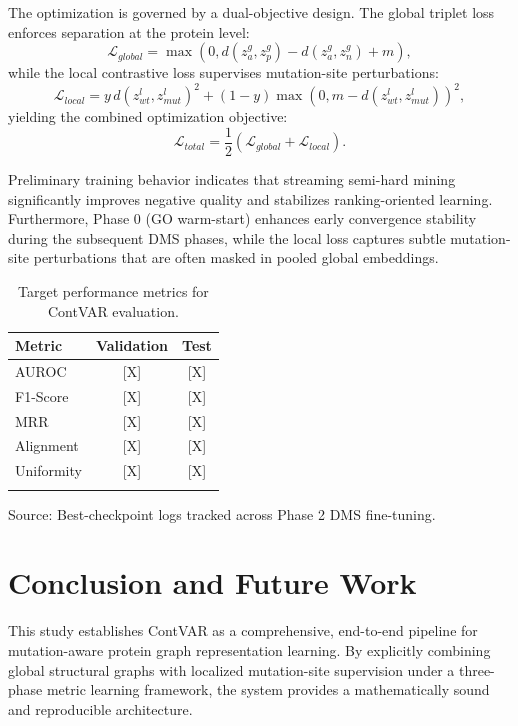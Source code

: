 \documentclass[unnumsec,webpdf,contemporary,large]{oup-authoring-template}%
\theoremstyle{thmstyleone}%
\theoremstyle{thmstyletwo}%
\theoremstyle{thmstylethree}%
\begin{document}
The optimization is governed by a dual-objective design. The global triplet loss enforces separation at the protein level:
\begin{equation}
\mathcal{L}_{global}=\max\left(0,d(z_a^g,z_p^g)-d(z_a^g,z_n^g)+m\right),
\label{eq1}
\end{equation}
while the local contrastive loss supervises mutation-site perturbations:
\begin{equation}
\mathcal{L}_{local}=y\,d(z_{wt}^l,z_{mut}^l)^2+(1-y)\max(0,m-d(z_{wt}^l,z_{mut}^l))^2,
\label{eq2}
\end{equation}
yielding the combined optimization objective:
\begin{equation}
\mathcal{L}_{total}=\frac{1}{2}\left(\mathcal{L}_{global}+\mathcal{L}_{local}\right).
\end{equation}

Preliminary training behavior indicates that streaming semi-hard mining significantly improves negative quality and stabilizes ranking-oriented learning. Furthermore, Phase 0 (GO warm-start) enhances early convergence stability during the subsequent DMS phases, while the local loss captures subtle mutation-site perturbations that are often masked in pooled global embeddings.

\begin{table}[!t]
\caption{Target performance metrics for ContVAR evaluation.\label{tab1}}%
\begin{tabular*}{\columnwidth}{@{\extracolsep\fill}lcc@{\extracolsep\fill}}
\toprule
Metric & Validation & Test\\
\midrule
AUROC & [X] & [X]\\
F1-Score & [X] & [X]\\
MRR & [X] & [X]\\
Alignment & [X] & [X]\\
Uniformity & [X] & [X]\\
\botrule
\end{tabular*}
\begin{tablenotes}%
\item Source: Best-checkpoint logs tracked across Phase 2 DMS fine-tuning.
\end{tablenotes}
\end{table}

\section{Conclusion and Future Work}\label{sec5}

This study establishes ContVAR as a comprehensive, end-to-end pipeline for mutation-aware protein graph representation learning. By explicitly combining global structural graphs with localized mutation-site supervision under a three-phase metric learning framework, the system provides a mathematically sound and reproducible architecture.
\end{document}
